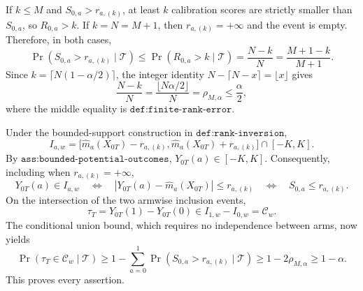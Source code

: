 If \(k\le M\) and \(S_{0,a}>r_{a,(k)}\), at least \(k\) calibration scores are strictly smaller than \(S_{0,a}\), so \(R_{0,a}>k\). If \(k=N=M+1\), then \(r_{a,(k)}=+\infty\) and the event is empty. Therefore, in both cases,
\[
\Pr(S_{0,a}>r_{a,(k)}\mid\mathcal T)\le\Pr(R_{0,a}>k\mid\mathcal T)=\frac{N-k}{N}=\frac{M+1-k}{M+1}.
\]
Since \(k=\lceil N(1-\alpha/2)\rceil\), the integer identity \(N-\lceil N-x\rceil=\lfloor x\rfloor\) gives
\[
\frac{N-k}{N}=\frac{\lfloor N\alpha/2\rfloor}{N}=\rho_{M,\alpha}\le\frac{\alpha}{2},
\]
where the middle equality is \(\texttt{def:finite-rank-error}\).

Under the bounded-support construction in \(\texttt{def:rank-inversion}\),
\[
I_{a,w}=\bigl[\widehat m_a(X_{0T})-r_{a,(k)},\widehat m_a(X_{0T})+r_{a,(k)}\bigr]\cap[-K,K].
\]
By \(\texttt{ass:bounded-potential-outcomes}\), \(Y_{0T}(a)\in[-K,K]\). Consequently, including when \(r_{a,(k)}=+\infty\),
\[
Y_{0T}(a)\in I_{a,w}\quad\Longleftrightarrow\quad |Y_{0T}(a)-\widehat m_a(X_{0T})|\le r_{a,(k)}\quad\Longleftrightarrow\quad S_{0,a}\le r_{a,(k)}.
\]
On the intersection of the two armwise inclusion events,
\[
\tau_T=Y_{0T}(1)-Y_{0T}(0)\in I_{1,w}-I_{0,w}=\mathcal C_w.
\]
The conditional union bound, which requires no independence between arms, now yields
\[
\Pr(\tau_T\in\mathcal C_w\mid\mathcal T)\ge1-\sum_{a=0}^1\Pr(S_{0,a}>r_{a,(k)}\mid\mathcal T)\ge1-2\rho_{M,\alpha}\ge1-\alpha.
\]
This proves every assertion.